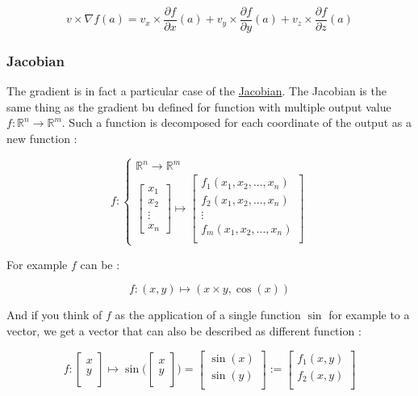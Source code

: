 \documentclass[12pt]{article}
\begin{document}
$$
v \times \nabla f(a) = v_x \times \frac{\partial{f}}{\partial{x}}(a) + v_y \times \frac{\partial{f}}{\partial{y}}(a) + v_z \times \frac{\partial{f}}{\partial{z}}(a) 
$$

\subsubsection{Jacobian}

The gradient is in fact a particular case of the \href{https://en.wikipedia.org/wiki/Jacobian_matrix_and_determinant}{Jacobian}. The Jacobian is the same thing as the gradient bu defined for function with multiple output value $f : \mathbb{R}^n \rightarrow \mathbb{R}^m$. Such a function is decomposed for each coordinate of the output as a new function :

$$
f : 
\begin{cases}
\mathbb{R}^n \rightarrow \mathbb{R}^m \\
\begin{bmatrix}
    x_1 \\
    x_2 \\
    \vdots \\
    x_n
\end{bmatrix} \mapsto

\begin{bmatrix}
    f_1(x_1, x_2, ..., x_n) \\
    f_2(x_1, x_2, ..., x_n) \\
    \vdots \\
    f_m(x_1, x_2, ..., x_n) \\
\end{bmatrix}

\end{cases}
$$

For example $f$ can be :

$$
f : (x,y) \mapsto (x \times y, \cos(x))
$$

And if you think of $f$ as the application of a single function $\sin$ for example to a vector, we get a vector that can also be described as different function :

$$
f : 
\begin{bmatrix}
    x \\
    y \\
\end{bmatrix}
 \mapsto \sin \big(
    \begin{bmatrix}
    x \\
    y \\
    \end{bmatrix}
 \big) = \begin{bmatrix}
    \sin(x) \\
    \sin(y) \\
\end{bmatrix}
:= \begin{bmatrix}
    f_1(x, y) \\
    f_2(x, y) \\
\end{bmatrix}
$$
\end{document}
